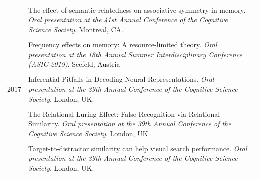 \documentclass[letterpaper]{article}
\begin{document}
\begin{longtable}{p{0.7cm}p{15cm}}
  & The effect of semantic relatedness on associative symmetry in memory. {\it Oral presentation at the 41st Annual Conference of the Cognitive Science Society}. Montreal, CA.                                                                            \\[6pt]
  &                                                                                                                                                                                                                                                        \\
  & Frequency effects on memory: A resource-limited theory. {\it Oral presentation at the 18th Annual Summer Interdisciplinary Conference (ASIC 2019)}. Seefeld, Austria                                                                                   \\[6pt]
  &                                                                                                                                                                                                                                                        \\
  2017 & Inferential Pitfalls in Decoding Neural Representations. {\it Oral presentation at the 39th Annual Conference of the Cognitive Science Society}. London, UK.                                                                                           \\[6pt]
  &                                                                                                                                                                                                                                                        \\
  & The Relational Luring Effect: False Recognition via Relational Similarity. {\it Oral presentation at the 39th Annual Conference of the Cognitive Science Society}. London, UK.                                                                         \\[6pt]
  &                                                                                                                                                                                                                                                        \\
  & Target-to-distractor similarity can help visual search performance. {\it Oral presentation at the 39th Annual Conference of the Cognitive Science Society}. London, UK.                                                                                \\[6pt]

\end{longtable}
\end{document}
